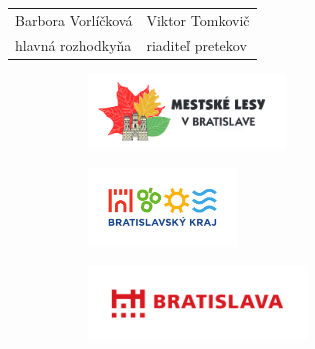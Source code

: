 \documentclass[a4paper,12pt]{article}
\begin{document}
\begin{center}
\begin{tabular}{ >{\centering}m{ } >{\centering}m{ } }
Barbora Vorlíčková & Viktor Tomkovič \tabularnewline
hlavná rozhodkyňa & riaditeľ pretekov
\end{tabular}
\end{center}

\begin{figure}[h!]
\centering
\begin{subfigure}{0.30\textwidth}
\centering
\includegraphics[height=2.0cm]{logo_lesyBA.png}
\end{subfigure}
\begin{subfigure}{0.30\textwidth}
\centering
\includegraphics[height=2.1cm]{logo_BSK.pdf}
\end{subfigure}
\begin{subfigure}{0.30\textwidth}
\centering
\includegraphics[height=2.0cm]{logo_BA.pdf}
\end{subfigure}
\end{figure}
\end{document}
